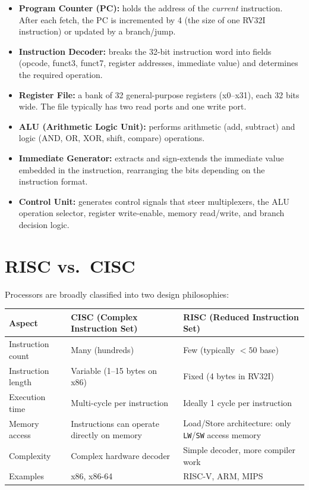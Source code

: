 \documentclass[12pt, a4paper, oneside]{book}
\begin{document}
\begin{itemize}
  \item \textbf{\color{purple}Program Counter (PC):} holds the address of the \textit{current} instruction. After each fetch, the PC is incremented by 4 (the size of one RV32I instruction) or updated by a branch/jump.
  \item \textbf{\color{purple}Instruction Decoder:} breaks the 32-bit instruction word into fields (opcode, funct3, funct7, register addresses, immediate value) and determines the required operation.
  \item \textbf{\color{purple}Register File:} a bank of 32 general-purpose registers (x0--x31), each 32 bits wide. The file typically has two read ports and one write port.
  \item \textbf{\color{purple}ALU (Arithmetic Logic Unit):} performs arithmetic (add, subtract) and logic (AND, OR, XOR, shift, compare) operations.
  \item \textbf{\color{purple}Immediate Generator:} extracts and sign-extends the immediate value embedded in the instruction, rearranging the bits depending on the instruction format.
  \item \textbf{\color{purple}Control Unit:} generates control signals that steer multiplexers, the ALU operation selector, register write-enable, memory read/write, and branch decision logic.
\end{itemize}

\section{RISC vs.\ CISC}

Processors are broadly classified into two design philosophies:

\begin{center}
\renewcommand{\arraystretch}{1.35}
\begin{tabular}{p{3.5cm} p{5.8cm} p{5.8cm}}
\toprule
\textbf{\color{purple}Aspect} & \textbf{\color{rtypecolor}CISC} \newline \footnotesize (Complex Instruction Set) & \textbf{\color{itypecolor}RISC} \newline \footnotesize (Reduced Instruction Set) \\
\midrule
Instruction count   & Many (hundreds)                & Few (typically $< 50$ base) \\
Instruction length   & Variable (1--15 bytes on x86)  & Fixed (4 bytes in RV32I) \\
Execution time       & Multi-cycle per instruction     & Ideally 1 cycle per instruction \\
Memory access        & Instructions can operate directly on memory & Load/Store architecture: only \texttt{LW}/\texttt{SW} access memory \\
Complexity           & Complex hardware decoder        & Simple decoder, more compiler work \\
Examples             & x86, x86-64                     & RISC-V, ARM, MIPS \\
\bottomrule
\end{tabular}
\end{center}
\end{document}
